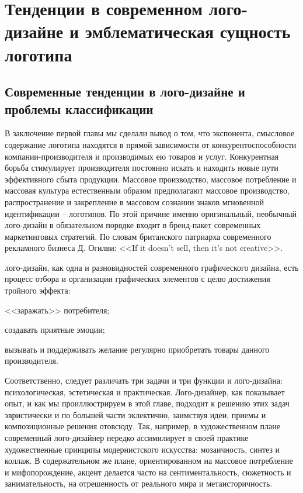 \section{Тенденции в современном лого-дизайне и эмблематическая сущность логотипа}

\subsection{Современные тенденции в лого-дизайне и проблемы классификации}

В заключение первой главы мы сделали вывод о том, что экспонента, смысловое содержание логотипа
находятся в прямой зависимости от конкурентоспособности компании-производителя  и производимых ею
товаров и услуг.  Конкурентная борьба стимулирует производителя постоянно искать и находить новые
пути эффективного сбыта продукции. Массовое производство, массовое потребление и массовая культура
естественным образом предполагают массовое производство, распространение и закрепление в массовом
сознании знаков мгновенной идентификации -- логотипов. По этой причине именно оригинальный, необычный
лого-дизайн в обязательном порядке входит в бренд-пакет современных маркетинговых стратегий. По
словам британского патриарха современного рекламного бизнеса Д. Огилви: <<If it doesn’t sell, then
it’s not creative>>.

лого-дизайн, как одна и разновидностей современного графического дизайна, есть процесс отбора и
организации графических элементов с целю достижения тройного эффекта:
\begin{enumerate*}[label=\asbuk*)]
\item <<заражать>> потребителя;
\item создавать приятные эмоции;
\item вызывать и поддерживать желание регулярно приобретать товары данного производителя.
\end{enumerate*}

Соответственно, следует различать три задачи и три функции и лого-дизайна:
психологическая, эстетическая и практическая. Лого-дизайнер, как показывает опыт, и как мы
проиллюстрируем в этой главе, подходит к решению этих задач эвристически и по большей части
эклектично, заимствуя идеи, приемы и композиционные решения отовсюду. Так, например, в
художественном плане современный лого-дизайнер нередко ассимилирует в своей практике художественные
принципы модернистского искусства: мозаичность, синтез и коллаж. В содержательном же плане,
ориентированном на массовое потребление и мифопорождение, акцент делается часто на
сентиментальность, сюжетность и занимательность, на отрешенность от реального мира и
метаисторичность. \autocite{book:konradova}

